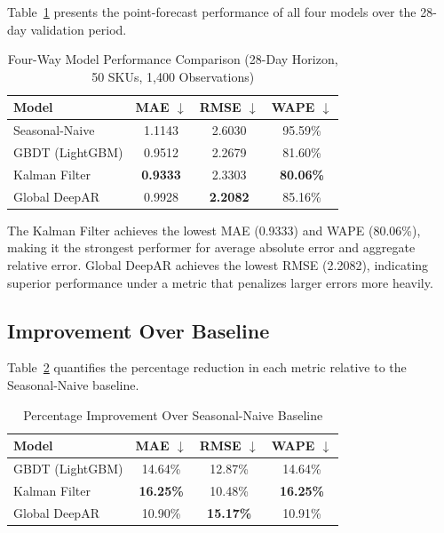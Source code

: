 \documentclass[conference]{IEEEtran}
\begin{document}
Table~\ref{tab:main_results} presents the point-forecast performance of all four models over the 28-day validation period.

\begin{table}[htbp]
\centering
\caption{Four-Way Model Performance Comparison (28-Day Horizon, 50 SKUs, 1,400 Observations)}
\label{tab:main_results}
\begin{tabular}{lccc}
\toprule
\textbf{Model} & \textbf{MAE $\downarrow$} & \textbf{RMSE $\downarrow$} & \textbf{WAPE $\downarrow$} \\
\midrule
Seasonal-Naive      & 1.1143 & 2.6030 & 95.59\% \\
GBDT (LightGBM)     & 0.9512 & 2.2679 & 81.60\% \\
Kalman Filter        & \textbf{0.9333} & 2.3303 & \textbf{80.06\%} \\
Global DeepAR        & 0.9928 & \textbf{2.2082} & 85.16\% \\
\bottomrule
\end{tabular}
\end{table}

The Kalman Filter achieves the lowest MAE (0.9333) and WAPE (80.06\%), making it the strongest performer for average absolute error and aggregate relative error. Global DeepAR achieves the lowest RMSE (2.2082), indicating superior performance under a metric that penalizes larger errors more heavily.

\subsection{Improvement Over Baseline}

Table~\ref{tab:improvement} quantifies the percentage reduction in each metric relative to the Seasonal-Naive baseline.

\begin{table}[htbp]
\centering
\caption{Percentage Improvement Over Seasonal-Naive Baseline}
\label{tab:improvement}
\begin{tabular}{lccc}
\toprule
\textbf{Model} & \textbf{MAE $\downarrow$} & \textbf{RMSE $\downarrow$} & \textbf{WAPE $\downarrow$} \\
\midrule
GBDT (LightGBM)  & 14.64\% & 12.87\% & 14.64\% \\
Kalman Filter     & \textbf{16.25\%} & 10.48\% & \textbf{16.25\%} \\
Global DeepAR     & 10.90\% & \textbf{15.17\%} & 10.91\% \\
\bottomrule
\end{tabular}
\end{table}
\end{document}
